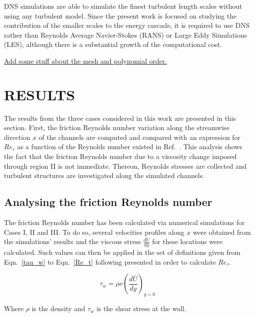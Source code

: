 \documentclass[twocolumn,10pt]{asme2e}
\begin{document}
DNS simulations are able to simulate the finest turbulent length scales without using any turbulent model. Since the present work is focused on studying the contribution of the smaller scales to the energy cascade, it is required to use DNS rather than Reynolds Average Navier-Stokes (RANS) or Large Eddy Simulations (LES), although there is a substantial growth of the computational cost.

\underline{Add some stuff about the mesh and polynomial order.}




\section*{RESULTS}

The results from the three cases considered in this work are presented in this section. First, the friction Reynolds number variation along the streamwise direction \(x\) of the channels are computed and compared with an expression for \(Re_{\tau}\) as a function of the Reynolds number existed in Ref.~\cite{pope}. This analysis shows the fact that the friction Reynolds number due to a viscosity change imposed through region II is not immediate. Thereon, Reynolds stresses are collected and turbulent structures are investigated along the simulated channels.


\subsection*{Analysing the friction Reynolds number}

The friction Reynolds number has been calculated via numerical simulations for Cases I, II and III. To do so, several velocities profiles along \(x\) were obtained from the simulations' results and the viscous stress \(\frac{d\bar{U}}{dy}\) for these locations were calculated. Such values can then be applied in the set of definitions given from Eqn.~\ref{tau_w} to Eqn.~\ref{Re_t} following presented in order to calculate \(Re_{\tau}\).

\begin{equation}
{\tau}_w = \rho\nu\left(\frac{d\bar{U}}{dy}\right)_{y=0}
\label{tau_w}
\end{equation}

Where \(\rho\) is the density and \({\tau}_w\)  is the shear stress at the wall.
\end{document}
